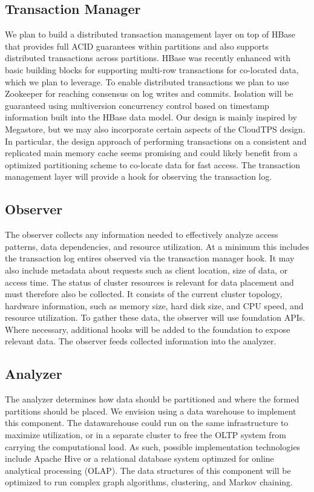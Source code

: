 \documentclass[10pt,final,journal]{IEEEtran}
\begin{document}
\subsection{Transaction Manager}
We plan to build a distributed transaction management layer on top of HBase that provides full ACID guarantees within partitions and also supports distributed transactions across partitions. HBase was recently enhanced with basic building blocks for supporting multi-row transactions for co-located data, which we plan to leverage. To enable distributed transactions we plan to use Zookeeper for reaching consensus on log writes and commits. Isolation will be guaranteed using multiversion concurrency control based on timestamp information built into the HBase data model. Our design is mainly inspired by Megastore, but we may also incorporate certain aspects of the CloudTPS design. In particular, the design approach of performing transactions on a consistent and replicated main memory cache seems promising and could likely benefit from a optimized partitioning scheme to co-locate data for fast access. The transaction management layer will provide a hook for observing the transaction log.

\subsection{Observer}
The observer collects any information needed to effectively analyze access patterns, data dependencies, and resource utilization. At a minimum this includes the transaction log entires observed via the transaction manager hook. It may also include metadata about requests such as client location, size of data, or access time. The status of cluster resources is relevant for data placement and must therefore also be collected. It consists of the current cluster topology, hardware information, such as memory size, hard disk size, and CPU speed, and resource utilization. To gather these data, the observer will use foundation APIs. Where necessary, additional hooks will be added to the foundation to expose relevant data. The observer feeds collected information into the analyzer.

\subsection{Analyzer}
The analyzer determines how data should be partitioned and where the formed partitions should be placed. We envision using a data warehouse to implement this component. The datawarehouse could run on the same infrastructure to maximize utilization, or in a separate cluster to free the OLTP system from carrying the computational load. As such, possible implementation technologies include Apache Hive or a relational database system optimzed for online analytical processing (OLAP). The data structures of this component will be optimized to run complex graph algorithms, clustering, and Markov chaining.
\end{document}
